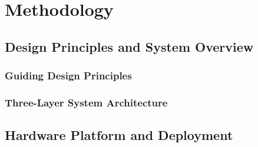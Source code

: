 \chapter{Methodology}
\label{ch:methodology}

\section{Design Principles and System Overview}
\label{sec:design-overview}

\subsection{Guiding Design Principles}
\label{subsec:design-principles}


\subsection{Three-Layer System Architecture}
\label{subsec:system-overview}



\section{Hardware Platform and Deployment}
\label{sec:hardware}

